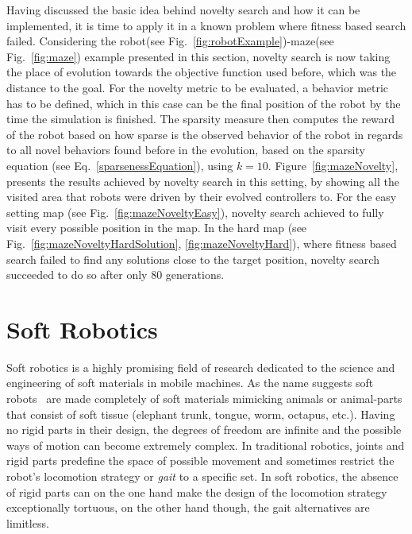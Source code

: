 Having discussed the basic idea behind novelty search and how it can be implemented, it is time to apply it in a known problem where fitness based search failed. Considering the robot(see Fig.~\ref{fig:robotExample})-maze(see Fig.~\ref{fig:maze}) example presented in this section, novelty search is now taking the place of evolution towards the objective function used before, which was the distance to the goal. For the novelty metric to be evaluated, a behavior metric has to be defined, which in this case can be the final position of the robot by the time the simulation is finished. The sparsity measure then computes the reward of the robot based on how sparse is the observed behavior of the robot in regards to all novel behaviors found before in the evolution, based on the sparsity equation (see Eq.~\ref{sparsenessEquation}), using $k = 10$. Figure~\ref{fig:mazeNovelty}, presents the results achieved by novelty search in this setting, by showing all the visited area that robots were driven by their evolved controllers to. For the easy setting map (see Fig.~\ref{fig:mazeNoveltyEasy}), novelty search achieved to fully visit every possible position in the map. In the hard map (see Fig.~\ref{fig:mazeNoveltyHardSolution}, \ref{fig:mazeNoveltyHard}), where fitness based search failed to find any solutions close to the target position, novelty search succeeded to do so after only $80$ generations.



\section{Soft Robotics}
Soft robotics is a highly promising field of research dedicated to the science and engineering of soft materials in mobile machines. As the name suggests soft robots~\citep{trivedi2008soft, pfeifer2012challenges} are made completely of soft materials mimicking animals or animal-parts that consist of soft tissue (elephant trunk, tongue, worm, octapus, etc.). Having no rigid parts in their design, the degrees of freedom are infinite and the possible ways of motion can become extremely complex. In traditional robotics, joints and rigid parts predefine the space of possible movement and sometimes restrict the robot's locomotion strategy or \emph{gait} to a specific set. In soft robotics, the absence of rigid parts can on the one hand make the design of the locomotion strategy exceptionally tortuous, on the other hand though, the gait alternatives are limitless.

